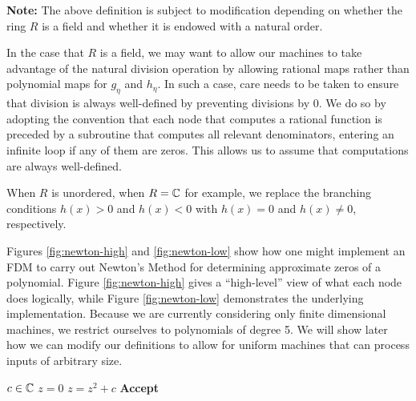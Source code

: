 \textbf{Note: }The above definition is subject to modification
depending on whether the ring $R$ is a field and whether it is endowed
with a natural order.

In the case that $R$ is a field, we may want to allow our machines to
take advantage of the natural division operation by allowing rational
maps rather than polynomial maps for $g_\eta$ and $h_\eta$.  In such a
case, care needs to be taken to ensure that division is always
well-defined by preventing divisions by $0$.  We do so by adopting the
convention that each node that computes a rational function is
preceded by a subroutine that computes all relevant denominators,
entering an infinite loop if any of them are zeros.  This allows us to
assume that computations are always well-defined.

When $R$ is unordered, when $R = \mathbb{C}$ for example, we replace
the branching conditions $h(x) > 0$ and $h(x) < 0$ with $h(x) = 0$ and
$h(x) \neq 0$, respectively.\\

\begin{example}
  Figures \ref{fig:newton-high} and \ref{fig:newton-low} show how one
  might implement an FDM to carry out Newton's Method for determining
  approximate zeros of a polynomial.  Figure \ref{fig:newton-high}
  gives a ``high-level'' view of what each node does logically, while
  Figure \ref{fig:newton-low} demonstrates the underlying
  implementation.  Because we are currently considering only finite
  dimensional machines, we restrict ourselves to polynomials of degree
  5.  We will show later how we can modify our definitions to allow
  for uniform machines that can process inputs of arbitrary size.
\end{example}

\begin{minipage}{0.5\linewidth}
  \begin{center}
    \begin{algorithmic}
      \Large \Require $c \in \mathbb{C}$ \State $z = 0$  \State $z = z^2 +c$
      \EndWhile
      \State \textbf{Accept}
    \end{algorithmic}
  \end{center}
\end{minipage}
\begin{minipage}{0.5\linewidth}
  \newtonhigh{}
\end{minipage}
 \label{fig:newton-high}

